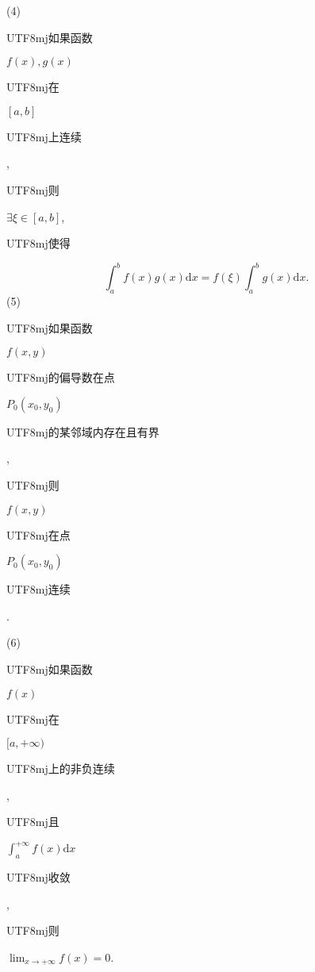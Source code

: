 \documentclass[10pt]{article}
\begin{document}
(4) \begin{CJK}{UTF8}{mj}如果函数\end{CJK} $f(x), g(x)$ \begin{CJK}{UTF8}{mj}在\end{CJK} $[a, b]$ \begin{CJK}{UTF8}{mj}上连续\end{CJK}, \begin{CJK}{UTF8}{mj}则\end{CJK} $\exists \xi \in[a, b]$, \begin{CJK}{UTF8}{mj}使得\end{CJK}
$$
\int_{a}^{b} f(x) g(x) \mathrm{d} x=f(\xi) \int_{a}^{b} g(x) \mathrm{d} x .
$$
(5) \begin{CJK}{UTF8}{mj}如果函数\end{CJK} $f(x, y)$ \begin{CJK}{UTF8}{mj}的偏导数在点\end{CJK} $P_{0}\left(x_{0}, y_{0}\right)$ \begin{CJK}{UTF8}{mj}的某邻域内存在且有界\end{CJK}, \begin{CJK}{UTF8}{mj}则\end{CJK} $f(x, y)$ \begin{CJK}{UTF8}{mj}在点\end{CJK} $P_{0}\left(x_{0}, y_{0}\right)$ \begin{CJK}{UTF8}{mj}连续\end{CJK}.

(6) \begin{CJK}{UTF8}{mj}如果函数\end{CJK} $f(x)$ \begin{CJK}{UTF8}{mj}在\end{CJK} $[a,+\infty)$ \begin{CJK}{UTF8}{mj}上的非负连续\end{CJK}, \begin{CJK}{UTF8}{mj}且\end{CJK} $\int_{a}^{+\infty} f(x) \mathrm{d} x$ \begin{CJK}{UTF8}{mj}收敛\end{CJK}, \begin{CJK}{UTF8}{mj}则\end{CJK} $\lim _{x \rightarrow+\infty} f(x)=0$.
\end{document}
